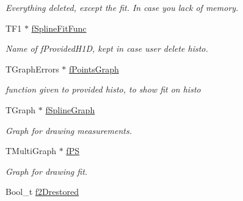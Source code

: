\begin{DoxyCompactItemize}
\begin{DoxyCompactList}\small\item\em Everything deleted, except the fit. In case you lack of memory. \item\end{DoxyCompactList}\item 
\hypertarget{classTSplineFit_ae7551c885341a259af6fe41f8954a34e}{
TF1 $\ast$ \hyperlink{classTSplineFit_ae7551c885341a259af6fe41f8954a34e}{fSplineFitFunc}}
\label{classTSplineFit_ae7551c885341a259af6fe41f8954a34e}

\begin{DoxyCompactList}\small\item\em Name of fProvidedH1D, kept in case user delete histo. \item\end{DoxyCompactList}\item 
\hypertarget{classTSplineFit_af15345f344209bd84c44df45229760d8}{
TGraphErrors $\ast$ \hyperlink{classTSplineFit_af15345f344209bd84c44df45229760d8}{fPointsGraph}}
\label{classTSplineFit_af15345f344209bd84c44df45229760d8}

\begin{DoxyCompactList}\small\item\em function given to provided histo, to show fit on histo \item\end{DoxyCompactList}\item 
\hypertarget{classTSplineFit_acf2a5ff32b79972d4f889720a97ee664}{
TGraph $\ast$ \hyperlink{classTSplineFit_acf2a5ff32b79972d4f889720a97ee664}{fSplineGraph}}
\label{classTSplineFit_acf2a5ff32b79972d4f889720a97ee664}

\begin{DoxyCompactList}\small\item\em Graph for drawing measurements. \item\end{DoxyCompactList}\item 
\hypertarget{classTSplineFit_a3d189c234f8474cb2afc90dc1ad6e04f}{
TMultiGraph $\ast$ \hyperlink{classTSplineFit_a3d189c234f8474cb2afc90dc1ad6e04f}{fPS}}
\label{classTSplineFit_a3d189c234f8474cb2afc90dc1ad6e04f}

\begin{DoxyCompactList}\small\item\em Graph for drawing fit. \item\end{DoxyCompactList}\item 
\hypertarget{classTSplineFit_a741d45f1c508943fd905aa8ff4c98c35}{
Bool\_\-t \hyperlink{classTSplineFit_a741d45f1c508943fd905aa8ff4c98c35}{f2Drestored}}
\label{classTSplineFit_a741d45f1c508943fd905aa8ff4c98c35}


\end{DoxyCompactItemize}
